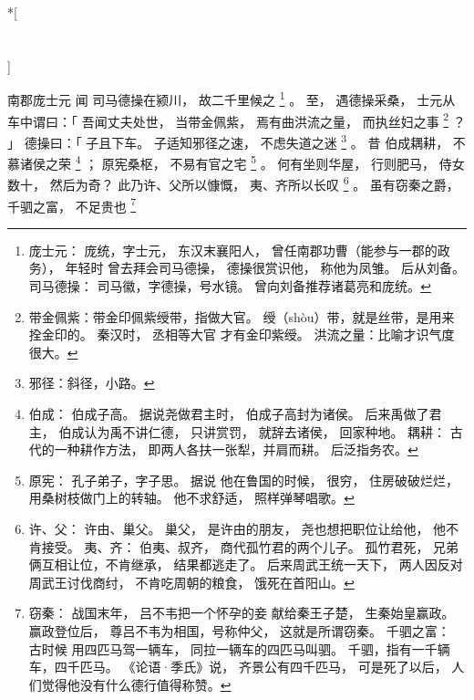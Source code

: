 
\switchcolumn[0]*[\section{}]

南郡庞士元
闻
司马德操在颍川，
故二千里候之%
\footnote{%
    庞士元：
        庞统，字士元，
        东汉末襄阳人，
        曾任南郡功曹（能参与一郡的政务），
        年轻时
        曾去拜会司马德操，
        德操很赏识他，
        称他为凤雏。
        后从刘备。
    司马德操：
        司马徽，字德操，号水镜。
        曾向刘备推荐诸葛亮和庞统。
}%
。
至，
遇德操采桑，
士元从车中谓曰：「
    吾闻丈夫处世，
    当带金佩紫，
    焉有曲洪流之量，
    而执丝妇之事%
    \footnote{%
        带金佩紫：带金印佩紫绶带，指做大官。
                  绶（shòu）带，就是丝带，是用来拴金印的。
                  秦汉时，
                  丞相等大官
                  才有金印紫绶。
        洪流之量：比喻才识气度很大。
    }%
    ？
」
德操曰：「
    子且下车。
    子适知邪径之速，
      不虑失道之迷%
      \footnote{%
          邪径：斜径，小路。
      }%
      。
    昔
    伯成耦耕，
    不慕诸侯之荣%
    \footnote{%
        伯成：
            伯成子高。
            据说尧做君主时，
            伯成子高封为诸侯。
            后来禹做了君主，
            伯成认为禹不讲仁德，
            只讲赏罚，
            就辞去诸侯，
            回家种地。
        耦耕：
            古代的一种耕作方法，
            即两人各扶一张犁，并肩而耕。
            后泛指务农。
    }%
    ；
    原宪桑枢，
    不易有官之宅%
    \footnote{%
        原宪：
            孔子弟子，字子思。
            据说
            他在鲁国的时候，
            很穷，
            住房破破烂烂，用桑树枝做门上的转轴。
            他不求舒适，
            照样弹琴唱歌。
    }%
    。
    何有坐则华屋，
        行则肥马，
        侍女数十，
    然后为奇？
    此乃许、父所以慷慨，
        夷、齐所以长叹%
        \footnote{%
            许、父：
                许由、巢父。
                巢父，
                是许由的朋友，
                尧也想把职位让给他，
                他不肯接受。
            夷、齐：
                伯夷、叔齐，
                商代孤竹君的两个儿子。
                孤竹君死，
                兄弟俩互相让位，不肯继承，
                结果都逃走了。
                后来周武王统一天下，
                两人因反对周武王讨伐商纣，
                不肯吃周朝的粮食，
                饿死在首阳山。
        }%
        。
    虽有窃秦之爵，
    千驷之富，
    不足贵也%
    \footnote{%
        窃秦：
            战国末年，
            吕不韦把一个怀孕的妾
            献给秦王子楚，
            生秦始皇赢政。
            赢政登位后，
            尊吕不韦为相国，号称仲父，
            这就是所谓窃秦。
        千驷之富：
            古时候
            用四匹马驾一辆车，
            同拉一辆车的四匹马叫驷。
            千驷，指有一千辆车，四千匹马。
            《论语·季氏》说，
            齐景公有四千匹马，
            可是死了以后，
            人们觉得他没有什么德行值得称赞。
    }%
